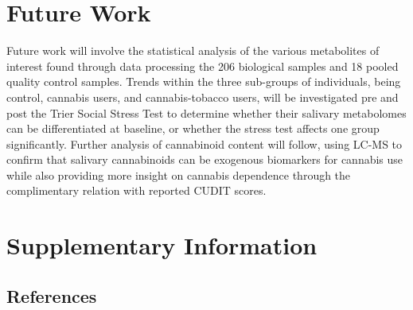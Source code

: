 \documentclass[journal=jacsat,manuscript=article]{achemso}
\begin{document}
\hypertarget{future-work}{%
\section{Future Work}\label{future-work}}

Future work will involve the statistical analysis of the various
metabolites of interest found through data processing the 206 biological
samples and 18 pooled quality control samples. Trends within the three
sub-groups of individuals, being control, cannabis users, and
cannabis-tobacco users, will be investigated pre and post the Trier
Social Stress Test to determine whether their salivary metabolomes can
be differentiated at baseline, or whether the stress test affects one
group significantly. Further analysis of cannabinoid content will
follow, using LC-MS to confirm that salivary cannabinoids can be
exogenous biomarkers for cannabis use while also providing more insight
on cannabis dependence through the complimentary relation with reported
CUDIT scores.

\hypertarget{supplementary-information}{%
\section{Supplementary Information}\label{supplementary-information}}

\hypertarget{references}{%
\subsection{References}\label{references}}
\end{document}
